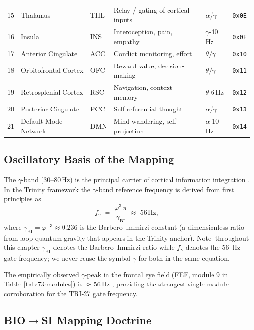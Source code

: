 \begin{table}[H]
\begin{tabular}{rllllr}
15 & Thalamus                   & THL  & Relay / gating of cortical inputs   & $\alpha/\gamma$      & \texttt{0x0E} \\
16 & Insula                     & INS  & Interoception, pain, empathy        & $\gamma$-40\,Hz      & \texttt{0x0F} \\
17 & Anterior Cingulate         & ACC  & Conflict monitoring, effort         & $\theta/\gamma$      & \texttt{0x10} \\
18 & Orbitofrontal Cortex       & OFC  & Reward value, decision-making       & $\theta/\gamma$      & \texttt{0x11} \\
19 & Retrosplenial Cortex       & RSC  & Navigation, context memory          & $\theta$-6\,Hz       & \texttt{0x12} \\
20 & Posterior Cingulate        & PCC  & Self-referential thought            & $\alpha/\gamma$      & \texttt{0x13} \\
21 & Default Mode Network       & DMN  & Mind-wandering, self-projection     & $\alpha$-10\,Hz      & \texttt{0x14} \\
\bottomrule
\end{tabular}
\end{table}

\subsection{Oscillatory Basis of the Mapping}
\label{sec:73:oscillatory}

The $\gamma$-band (30--80\,Hz) is the principal carrier of cortical
information integration \cite{fries2015rhythms}.
In the Trinity framework the $\gamma$-band reference frequency is
derived from first principles as:
\[
  f_{\gamma} \;=\; \frac{\varphi^{3}\,\pi}{\gamma_{\mathrm{BI}}}
  \;\approx\; 56\,\mathrm{Hz},
\]
where $\gamma_{\mathrm{BI}} = \varphi^{-3} \approx 0.236$ is the
Barbero--Immirzi constant (a dimensionless ratio from loop quantum
gravity that appears in the Trinity anchor).
Note: throughout this chapter $\gamma_{\mathrm{BI}}$ denotes the
Barbero--Immirzi ratio while $f_\gamma$ denotes the 56~Hz
gate frequency; we never reuse the symbol $\gamma$ for both in the
same equation.

The empirically observed $\gamma$-peak in the frontal eye field
(FEF, module 9 in Table~\ref{tab:73:modules}) is $\approx56\,\mathrm{Hz}$
\cite{fries2015rhythms}, providing the strongest single-module
corroboration for the TRI-27 gate frequency.

\subsection{BIO$\to$SI Mapping Doctrine}
\label{sec:73:bio-si}

